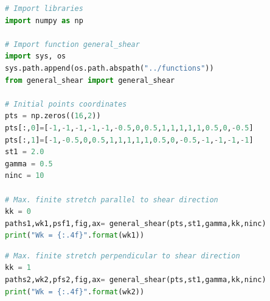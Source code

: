 \documentclass[a4paper , 12pt]{book}
\begin{document}
\begin{center}
\begin{lstlisting}[language=Python, frame=single]
# Import libraries
import numpy as np

# Import function general_shear
import sys, os
sys.path.append(os.path.abspath("../functions"))
from general_shear import general_shear

# Initial points coordinates
pts = np.zeros((16,2))
pts[:,0]=[-1,-1,-1,-1,-1,-0.5,0,0.5,1,1,1,1,1,0.5,0,-0.5]
pts[:,1]=[-1,-0.5,0,0.5,1,1,1,1,1,0.5,0,-0.5,-1,-1,-1,-1]
st1 = 2.0
gamma = 0.5
ninc = 10

# Max. finite stretch parallel to shear direction
kk = 0
paths1,wk1,psf1,fig,ax= general_shear(pts,st1,gamma,kk,ninc)
print("Wk = {:.4f}".format(wk1))
\end{lstlisting}
\end{center}

\begin{center}
\begin{lstlisting}[language=Python, frame=single]
# Max. finite stretch perpendicular to shear direction
kk = 1
paths2,wk2,pfs2,fig,ax= general_shear(pts,st1,gamma,kk,ninc)
print("Wk = {:.4f}".format(wk2))
\end{lstlisting}
\end{center}
\end{document}
